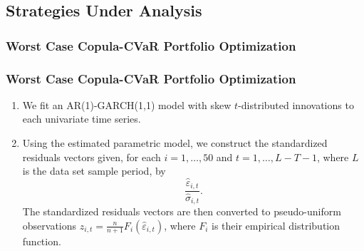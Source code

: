 \documentclass[pdf,10pt,xcolor=dvipsnames,hide notes]{beamer}
\begin{document}
\subsection{Strategies Under Analysis}

\subsubsection{Worst Case Copula-CVaR Portfolio Optimization}
\begin{frame}[label=frame5]
\frametitle{Worst Case Copula-CVaR Portfolio Optimization}

\begin{enumerate}
	\setcounter{enumi}{0}
	\setlength{\parskip}{15pt}
\justifying
\item We fit an AR(1)-GARCH(1,1) model with skew $t$-distributed innovations to each univariate time series.

\item Using the estimated parametric model, we construct the standardized
residuals vectors given, for each $i=1,\ldots,50$ and $t=1,\ldots,L-T-1$, where $L$ is the data set sample period, by
\begin{equation*}
\frac{\widehat{\varepsilon }_{i,t}}{\widehat{\sigma }_{i,t}}.
\end{equation*}%
The standardized residuals vectors are then converted to pseudo-uniform
observations $z_{i,t}=\frac{n}{n+1}F_{i}\left( \widehat{\varepsilon }%
_{i,t}\right) $, where $F_{i}$ is their empirical distribution function.

 
 \end{enumerate}

\end{frame}
\end{document}
